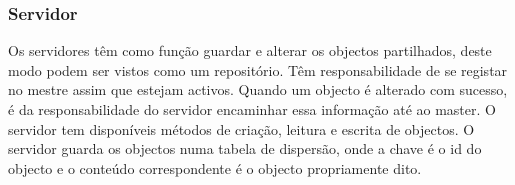 \subsubsection{Servidor}

Os servidores têm como função guardar e alterar os objectos partilhados, deste modo podem ser vistos como um repositório. Têm responsabilidade de se registar no mestre assim que estejam activos. Quando um objecto é alterado com sucesso, é da responsabilidade do servidor encaminhar essa informação até ao master. O servidor tem disponíveis métodos de criação, leitura e escrita de objectos. O servidor guarda os objectos numa tabela de dispersão, onde a chave é o id do objecto e o conteúdo correspondente é o objecto propriamente dito. 